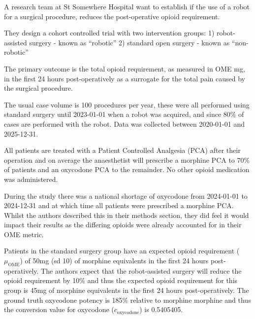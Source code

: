 \documentclass[
  letterpaper,
  DIV=11,
  numbers=noendperiod]{scrreprt}
\newcounter{quartocalloutnteno}
\newcommand{\quartocalloutnte}[1]{\refstepcounter{quartocalloutnteno}\label{#1}}
\begin{document}
\begin{tcolorbox}[enhanced jigsaw, toprule=.15mm, titlerule=0mm, colframe=quarto-callout-note-color-frame, bottomrule=.15mm, colback=white, opacitybacktitle=0.6, coltitle=black, arc=.35mm, colbacktitle=quarto-callout-note-color!10!white, rightrule=.15mm, opacityback=0, breakable, title=\textcolor{quarto-callout-note-color}{\faInfo}\hspace{0.5em}{Note \ref*{nte-sim-design}: Simulated trial design}, left=2mm, toptitle=1mm, leftrule=.75mm, bottomtitle=1mm]

\quartocalloutnte{nte-sim-design} 

A research team at St Somewhere Hospital want to establish if the use of
a robot for a surgical procedure, reduces the post-operative opioid
requirement.

They design a cohort controlled trial with two intervention groups: 1)
robot-assisted surgery - known as ``robotic'' 2) standard open surgery -
known as ``non-robotic''

The primary outcome is the total opioid requirement, as measured in OME
mg, in the first 24 hours post-operatively as a surrogate for the total
pain caused by the surgical procedure.

The usual case volume is 100 procedures per year, these were all
performed using standard surgery until 2023-01-01 when a robot was
acquired, and since 80\% of cases are performed with the robot. Data was
collected between 2020-01-01 and 2025-12-31.

All patients are treated with a Patient Controlled Analgesia (PCA) after
their operation and on average the anaesthetist will prescribe a
morphine PCA to 70\% of patients and an oxycodone PCA to the remainder.
No other opioid medication was administered.

During the study there was a national shortage of oxycodone from
2024-01-01 to 2024-12-31 and at which time all patients were prescribed
a morphine PCA. Whilst the authors described this in their methods
section, they did feel it would impact their results as the differing
opioids were already accounted for in their OME metric.

Patients in the standard surgery group have an expected opioid
requirement (\(\mu_{\text{OME}}\)) of 50mg (sd 10) of morphine
equivalents in the first 24 hours post-operatively. The authors expect
that the robot-assisted surgery will reduce the opioid requirement by
10\% and thus the expected opioid requirement for this group is 45mg of
morphine equivalents in the first 24 hours post-operatively. The ground
truth oxycodone potency is 185\% relative to morphine morphine and thus
the conversion value for oxycodone (\(c_{\text{oxycodone}}\)) is
0.5405405.

\end{tcolorbox}
\end{document}
